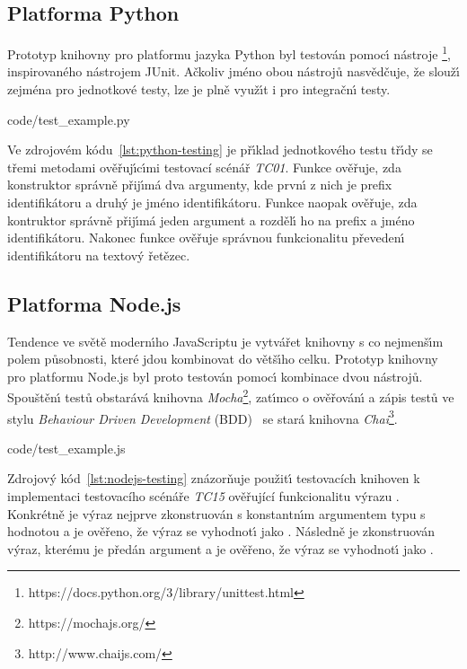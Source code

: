 \subsection{Platforma Python}

Prototyp knihovny pro platformu jazyka Python byl testován pomoc\'{\i}
nástroje \footnote{https://docs.python.org/3/library/unittest.html}, inspirovaného nástrojem
JUnit. Ačkoliv jméno obou nástrojů nasvědčuje, že slouž\'{\i} zejména pro jednotkové testy,
lze je plně využ\'{\i}t i pro integračn\'{\i} testy.


{code/test_example.py}

Ve zdrojovém kódu~\ref{lst:python-testing} je př\'{\i}klad jednotkového testu tř\'{\i}dy
 se třemi metodami ověřuj\'{\i}c\'{\i}mi testovací scénář \textit{TC01}.
Funkce  ověřuje, zda konstruktor správně přij\'{\i}má dva argumenty,
kde prvn\'{\i} z nich je prefix identifikátoru a druh\'y je jméno identifikátoru.
Funkce  naopak ověřuje, zda kontruktor správně přij\'{\i}má jeden
argument a rozděl\'{\i} ho na prefix a jméno identifikátoru.
Nakonec funkce  ověřuje správnou funkcionalitu převeden\'{\i}
identifikátoru na textov\'y řetězec.

\subsection{Platforma Node.js}

Tendence ve světě modern\'{\i}ho JavaScriptu je vytvářet knihovny s co nejmenš\'{\i}m polem působnosti,
které jdou kombinovat do větš\'{\i}ho celku. Prototyp knihovny pro platformu Node.js byl proto testován pomoc\'{\i}
kombinace dvou nástrojů. Spouštěn\'{\i} testů obstarává knihovna \textit{Mocha}\footnote{https://mochajs.org/}, zat\'{\i}mco
o ověřován\'{\i} a zápis testů ve stylu \textit{Behaviour Driven Development} (\gls{BDD})~\cite{solis2011study}
se stará knihovna \textit{Chai}\footnote{http://www.chaijs.com/}.


{code/test_example.js}

Zdrojov\'y kód~\ref{lst:nodejs-testing} znázorňuje použit\'{\i} testovacích knihoven k implementaci testovacího
scénáře \textit{TC15} ověřující funkcionalitu výrazu . Konkrétně je výraz nejprve zkonstruován s
konstantn\'{\i}m argumentem typu  s hodnotou  a je ověřeno, že v\'yraz se vyhodnot\'{\i}
jako . Následně je zkonstruován v\'yraz, kterému je předán argument  a je ověřeno,
že v\'yraz se vyhodnot\'{\i} jako .

